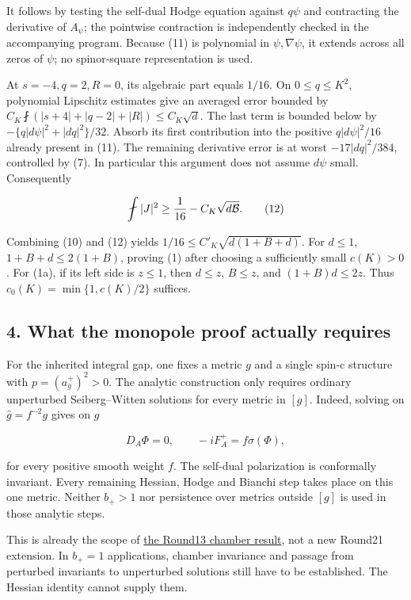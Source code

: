 \documentclass[
  10pt,
]{article}
\begin{document}
It follows by testing the self-dual Hodge equation against \(q\psi\) and
contracting the derivative of \(A_\psi\); the pointwise contraction is
independently checked in the accompanying program. Because (11) is
polynomial in \(\psi,\nabla\psi\), it extends across all zeros of
\(\psi\); no spinor-square representation is used.

At \(s=-4,q=2,R=0\), its algebraic part equals \(1/16\). On
\(0\le q\le K^2\), polynomial Lipschitz estimates give an averaged error
bounded by \(C_K\fint(|s+4|+|q-2|+|R|)\le C_K\sqrt d\). The last term is
bounded below by \(-\{q|d\psi|^2+|dq|^2\}/32\). Absorb its first
contribution into the positive \(q|d\psi|^2/16\) already present in
(11). The remaining derivative error is at worst \(-17|dq|^2/384\),
controlled by (7). In particular this argument does not assume \(d\psi\)
small. Consequently

\[
           \fint|J|^2\ge {1\over16}-C_K\sqrt{d\mathcal B}.\tag{12}
\]

Combining (10) and (12) yields \(1/16\le C'_K\sqrt{d(1+B+d)}\). For
\(d\le1\), \(1+B+d\le2(1+B)\), proving (1) after choosing a sufficiently
small \(c(K)>0\). For (1a), if its left side is \(z\le1\), then
\(d\le z\), \(B\le z\), and \((1+B)d\le2z\). Thus
\(c_0(K)=\min\{1,c(K)/2\}\) suffices.

\hypertarget{what-the-monopole-proof-actually-requires}{%
\subsection{4. What the monopole proof actually
requires}\label{what-the-monopole-proof-actually-requires}}

For the inherited integral gap, one fixes a metric \(g\) and a single
spin-c structure with \(p=(a_g^+)^2>0\). The analytic construction only
requires ordinary unperturbed Seiberg--Witten solutions for every metric
in \([g]\). Indeed, solving on \(\widehat g=f^{-2}g\) gives on \(g\)

\[
 D_A\Phi=0,\qquad -iF_A^+=f\sigma(\Phi),
\]

for every positive smooth weight \(f\). The self-dual polarization is
conformally invariant. Every remaining Hessian, Hodge and Bianchi step
takes place on this one metric. Neither \(b_+>1\) nor persistence over
metrics outside \([g]\) is used in those analytic steps.

This is already the scope of \href{round13_chamber.md}{the Round13
chamber result}, not a new Round21 extension. In \(b_+=1\) applications,
chamber invariance and passage from perturbed invariants to unperturbed
solutions still have to be established. The Hessian identity cannot
supply them.
\end{document}
